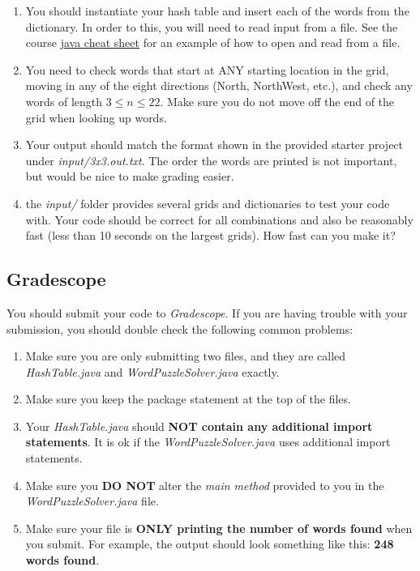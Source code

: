 \documentclass[paper=a4, fontsize=11pt, parskip=full]{scrartcl} %
\numberwithin{equation}{section} %
\numberwithin{figure}{section} %
\numberwithin{table}{section} %
\begin{document}
\begin{enumerate}
	\item You should instantiate your hash table and insert each of the words from the dictionary. In order to this, you will need to read input from a file. See the course \href{https://uva-cs.github.io/dsa1/java/javaCheatSheet/javaCheatSheet.pdf}{java cheat sheet} for an example of how to open and read from a file.
	\item You need to check words that start at ANY starting location in the grid, moving in any of the eight directions (North, NorthWest, etc.), and check any words of length $3 \leq n \leq 22$. Make sure you do not move off the end of the grid when looking up words.
	\item Your output should match the format shown in the provided starter project under \emph{input/3x3.out.txt}. The order the words are printed is not important, but would be nice to make grading easier.
	\item the \emph{input/} folder provides several grids and dictionaries to test your code with. Your code should be correct for all combinations and also be reasonably fast (less than 10 seconds on the largest grids). How fast can you make it?
\end{enumerate}

\subsection{Gradescope}

You should submit your code to \emph{Gradescope}. If you are having trouble with your submission, you should double check the following common problems:

\begin{enumerate}
  \item Make sure you are only submitting two files, and they are called \emph{HashTable.java} and \emph{WordPuzzleSolver.java} exactly.
  \item Make sure you keep the package statement at the top of the files.
  \item Your \emph{HashTable.java} should \textbf{NOT contain any additional import statements}. It is ok if the \emph{WordPuzzleSolver.java} uses additional import statements.
  \item Make sure you \textbf{DO NOT} alter the \emph{main method} provided to you in the \emph{WordPuzzleSolver.java} file.
  \item Make sure your file is \textbf{ONLY printing the number of words found} when you submit. For example, the output should look something like this: \textbf{248 words found}.
\end{enumerate}


\end{document}
